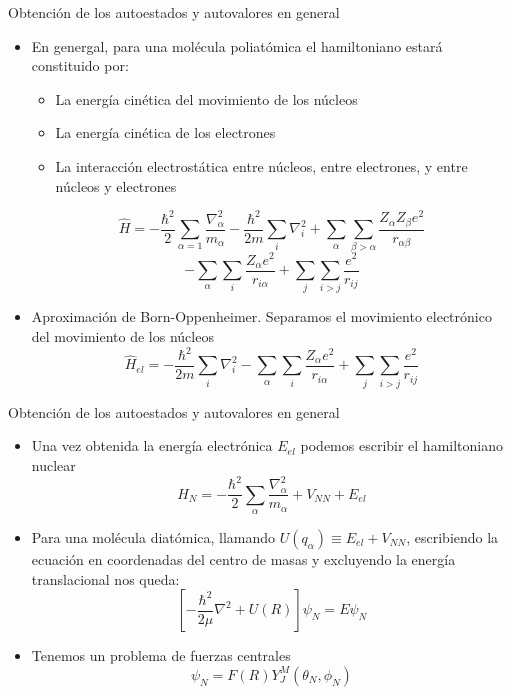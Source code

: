\documentclass[a4paper]{beamer}
\begin{document}
\begin{frame}{Obtención de los autoestados y autovalores en general}
\begin{itemize}
\item En genergal, para una molécula poliatómica el hamiltoniano estará constituido por:
\begin{itemize}
\item La energía cinética del movimiento de los núcleos
\item La energía cinética de los electrones
\item La interacción electrostática entre núcleos, entre electrones, y entre núcleos y electrones
\end{itemize}
$$
\hat H = -\frac{\hbar^2}{2}\sum_{\alpha=1}\frac{\nabla_\alpha^2}{m_\alpha}-\frac{\hbar^2}{2m}\sum_{i}\nabla_i^2+\sum_\alpha\sum_{\beta >\alpha}\frac{Z_\alpha Z_\beta e^2}{r_{\alpha \beta}}
$$
\begin{equation}
-\sum_\alpha\sum_i\frac{Z_\alpha e^2}{r_{i\alpha}}+\sum_j\sum_{i>j}\frac{e^2}{r_{ij}}
\end{equation}
\item Aproximación de Born-Oppenheimer. Separamos el movimiento electrónico del movimiento de los núcleos
\begin{equation}
\hat H_{el} = -\frac{\hbar^2}{2m}\sum_{i}\nabla_i^2-\sum_\alpha\sum_i\frac{Z_\alpha e^2}{r_{i\alpha}}+\sum_j\sum_{i>j}\frac{e^2}{r_{ij}}
\end{equation}
\end{itemize}
\end{frame}

\begin{frame}{Obtención de los autoestados y autovalores en general}
\begin{itemize}
\item Una vez obtenida la energía  electrónica $E_{el}$ podemos escribir el hamiltoniano nuclear
\begin{equation}
\hat H_N=-\frac{\hbar^2}{2}\sum_\alpha \frac{\nabla^2_\alpha}{m_\alpha}+V_{NN}+E_{el}
\end{equation}
\item Para una molécula diatómica, llamando $U(q_\alpha)\equiv E_{el}+V_{NN}$, escribiendo la ecuación en coordenadas del centro de masas y excluyendo la energía translacional nos queda:
\begin{equation}
\left[-\frac{\hbar^2}{2\mu}\nabla^2+U(R)\right]\psi_N=E\psi_N
\end{equation}
\item Tenemos un problema de fuerzas centrales
\begin{equation}
\psi_N=F(R)Y^M_J(\theta_N,\phi_N)
\end{equation}
\end{itemize}
\end{frame}
\end{document}

